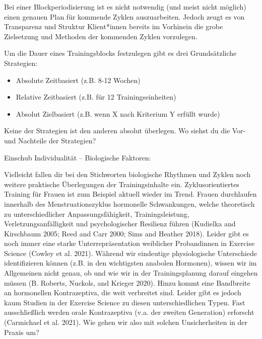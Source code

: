\documentclass[
  letterpaper,
  DIV=11,
  numbers=noendperiod]{scrreprt}
\providecommand{\tightlist}{%
  \setlength{\itemsep}{0pt}\setlength{\parskip}{0pt}}
\begin{document}
Bei einer Blockperiodisierung ist es nicht notwendig (und meist nicht
möglich) einen genauen Plan für kommende Zyklen auszuarbeiten. Jedoch
zeugt es von Transparenz und Struktur Klient*innen bereits im Vorhinein
die grobe Zielsetzung und Methoden der kommenden Zyklen vorzulegen.

Um die Dauer eines Trainingsblocks festzulegen gibt es drei
Grundsätzliche Strategien:

\begin{itemize}
\tightlist
\item
  Absolute Zeitbasiert (z.B. 8-12 Wochen)
\item
  Relative Zeitbasiert (z.B. für 12 Trainingseinheiten)
\item
  Absolut Zielbasiert (z.B. wenn X nach Kriterium Y erfüllt wurde)
\end{itemize}

Keine der Strategien ist den anderen absolut überlegen. Wo siehst du die
Vor- und Nachteile der Strategien?

\begin{tcolorbox}[enhanced jigsaw, colback=white, toptitle=1mm, opacitybacktitle=0.6, title=\textcolor{quarto-callout-note-color}{\faInfo}\hspace{0.5em}{Note}, colframe=quarto-callout-note-color-frame, colbacktitle=quarto-callout-note-color!10!white, toprule=.15mm, rightrule=.15mm, bottomtitle=1mm, left=2mm, arc=.35mm, opacityback=0, titlerule=0mm, coltitle=black, breakable, leftrule=.75mm, bottomrule=.15mm]

Einschub Individualität -- Biologische Faktoren:

Vielleicht fallen dir bei den Stichworten biologische Rhythmen und
Zyklen noch weitere praktische Überlegungen der Trainingsinhalte ein.
Zyklusorientiertes Training für Frauen ist zum Beispiel aktuell wieder
im Trend. Frauen durchlaufen innerhalb des Menstruationszyklus
hormonelle Schwankungen, welche theoretisch zu unterschiedlicher
Anpassungsfähigkeit, Trainingsleistung, Verletzungsanfälligkeit und
psychologischer Resilienz führen (Kudielka and Kirschbaum 2005; Reed and
Carr 2000; Sims and Heather 2018). Leider gibt es noch immer eine starke
Unterrepräsentation weiblicher Probandinnen in Exercise Science (Cowley
et al. 2021). Während wir eindeutige physiologische Unterschiede
identifizieren können (z.B. in den wichtigsten anabolen Hormonen),
wissen wir im Allgemeinen nicht genau, ob und wie wir in der
Trainingsplanung darauf eingehen müssen (B. Roberts, Nuckols, and
Krieger 2020). Hinzu kommt eine Bandbreite an hormonellen Kontrazeptiva,
die weit verbreitet sind. Leider gibt es jedoch kaum Studien in der
Exercise Science zu diesen unterschiedlichen Typen. Fast ausschließlich
werden orale Kontrazeptiva (v.a. der zweiten Generation) erforscht
(Carmichael et al. 2021). Wie gehen wir also mit solchen Unsicherheiten
in der Praxis um?

\end{tcolorbox}
\end{document}
